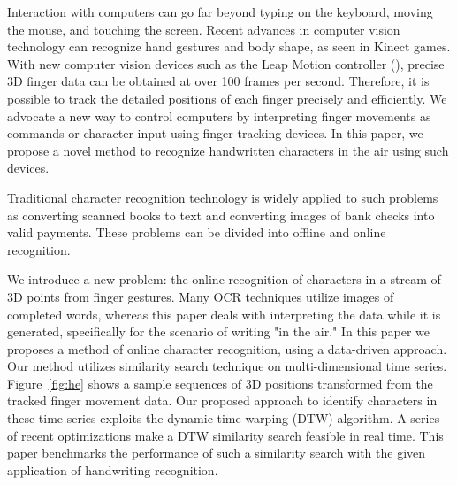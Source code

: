 Interaction with computers can go far beyond typing on the keyboard,
moving the mouse, and touching the screen. 
Recent advances in computer vision technology can recognize 
hand gestures and body shape, as seen in Kinect games. 
With new computer vision devices such as the Leap Motion controller (), 
 precise 3D finger data can be obtained at over 100 frames per second.   
Therefore, it is possible to track the detailed positions of 
each finger precisely and efficiently. 
We advocate a new way to control computers by interpreting finger
movements as commands or character input using finger tracking devices.
In this paper, we propose a novel method to recognize handwritten
 characters in the air using such devices. 


Traditional character recognition technology is widely applied to such problems
as converting scanned books to text and converting images of bank checks into
valid payments. These problems can be divided into offline and online
recognition. 

We introduce a new problem: the online recognition of characters in a
 stream of 3D points from finger gestures. 
 Many OCR techniques utilize images of completed words, 
 whereas this paper deals with interpreting the data while it is generated,
specifically for the scenario of writing "in the air."  
In this paper we proposes a method of online character recognition, 
using a data-driven approach. 
Our method utilizes similarity search
technique on multi-dimensional time series. Figure~\ref{fig:he} shows a sample
sequences of 3D positions transformed from the tracked finger movement data. Our proposed approach to identify characters in these time series
 exploits the dynamic time warping (DTW) algorithm. 
A series of recent optimizations make a
DTW similarity search feasible in real time. This paper benchmarks the
performance of such a similarity search with the given application of
handwriting recognition.



